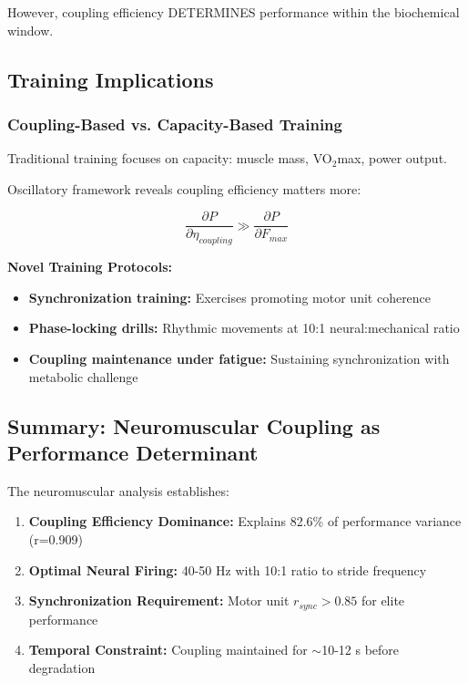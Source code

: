 However, coupling efficiency DETERMINES performance within the biochemical window.

\subsection{Training Implications}

\subsubsection{Coupling-Based vs. Capacity-Based Training}

Traditional training focuses on capacity: muscle mass, VO$_2$max, power output.

Oscillatory framework reveals coupling efficiency matters more:

\begin{equation}
\frac{\partial P}{\partial \eta_{coupling}} \gg \frac{\partial P}{\partial F_{max}}
\label{eq:sensitivity_comparison}
\end{equation}

\textbf{Novel Training Protocols:}
\begin{itemize}
\item \textbf{Synchronization training:} Exercises promoting motor unit coherence
\item \textbf{Phase-locking drills:} Rhythmic movements at 10:1 neural:mechanical ratio
\item \textbf{Coupling maintenance under fatigue:} Sustaining synchronization with metabolic challenge
\end{itemize}

\subsection{Summary: Neuromuscular Coupling as Performance Determinant}

The neuromuscular analysis establishes:

\begin{enumerate}
\item \textbf{Coupling Efficiency Dominance:} Explains 82.6\% of performance variance (r=0.909)
\item \textbf{Optimal Neural Firing:} 40-50 Hz with 10:1 ratio to stride frequency
\item \textbf{Synchronization Requirement:} Motor unit $r_{sync} > 0.85$ for elite performance
\item \textbf{Temporal Constraint:} Coupling maintained for $\sim$10-12 s before degradation
\end{enumerate}


